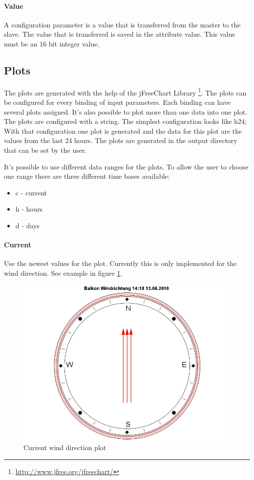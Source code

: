 \paragraph{Value} %
\label{par:value}
A configuration parameter is a value that is transferred from the master to the slave. The value that is transferred is saved in the attribute value. This value must be an 16 bit integer value.


\subsection{Plots} %
\label{sub:plots}
The plots are generated with the help of the jFreeChart Library \footnote{\url{http://www.jfree.org/jfreechart/}}.
The plots can be configured for every binding of input parameters. Each binding can have several plots assigned. It's also possible to plot more than one data into one plot. The plots are configured with a string. The simplest configuration looks like {\C h24;} With that configuration one plot is generated and the data for this plot are the values from the last 24 hours. The plots are generated in the output directory that can be set by the user.

It's possible to use different data ranges for the plots. To allow the user to choose one range there are three different time bases available:
\begin{itemize}
	\item c - current
	\item h - hours
	\item d - days
\end{itemize}

\paragraph{Current} %
\label{par:current}
Use the newest values for the plot. Currently this is only implemented for the wind direction. See example in figure \ref{fig:current}.
\begin{figure}[ht]
    \centering
    \includegraphics[width=0.9\linewidth]{master/plot_examplec.png}
    \caption{Current wind direction plot}
    \label{fig:current}
\end{figure}


